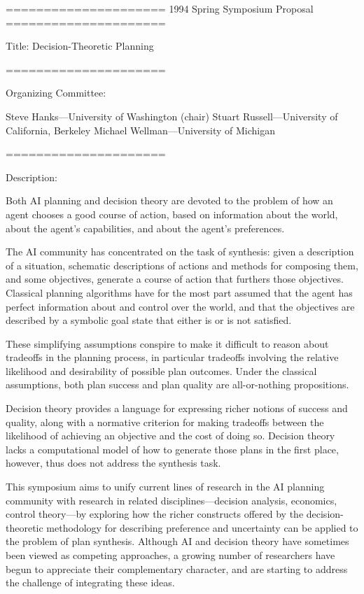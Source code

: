 
=====================
1994 Spring Symposium Proposal
=====================

Title:  Decision-Theoretic Planning

=====================

Organizing Committee:

   Steve Hanks---University of Washington (chair)
   Stuart Russell---University of California, Berkeley
   Michael Wellman---University of Michigan

=====================

Description:

Both AI planning and decision theory are devoted to the problem 
of how an agent chooses a good course of action, based on information 
about the world, about the agent's capabilities, and about 
the agent's preferences. 

The AI community has concentrated on the task of synthesis: given a 
description of a situation, schematic descriptions of actions and 
methods for composing them, and some objectives, generate a course 
of action that furthers those objectives.   Classical planning algorithms
have for the most part assumed that the agent has perfect information 
about and control over the world, and that the objectives are described 
by a symbolic goal state that either is or is not satisfied.

These simplifying assumptions conspire to make it difficult to reason about
tradeoffs in the planning process, in particular tradeoffs involving the
relative likelihood and desirability of possible plan outcomes.  Under the
classical assumptions, both plan success and plan quality are
all-or-nothing propositions.

Decision theory provides a language for expressing richer notions of
success and quality, along with a normative criterion for making tradeoffs
between the likelihood of achieving an objective and the cost of 
doing so. Decision theory lacks a computational model of how to generate 
those plans in the first place, however, thus does not address the synthesis 
task.

This symposium aims to unify current lines of research in the AI planning
community with research in related disciplines---decision analysis,
economics, control theory---by exploring how the richer constructs offered
by the decision-theoretic methodology for describing preference and
uncertainty can be applied to the problem of plan synthesis.  Although AI
and decision theory have sometimes been viewed as competing approaches, a
growing number of researchers have begun to appreciate their complementary
character, and are starting to address the challenge of integrating these
ideas.

